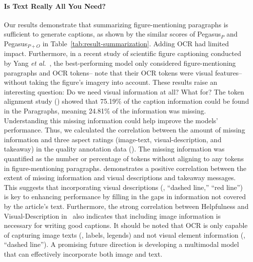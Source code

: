 \paragraph{Is Text Really All You Need?}
Our results demonstrate that summarizing figure-mentioning paragraphs is sufficient to generate captions, as shown by the similar scores of Pegasus$_{P}$ and Pegasus$_{P+O}$ in Table~\ref{tab:result-summarization}.
Adding OCR had limited impact.
Furthermore,
in a recent study of scientific figure captioning conducted by Yang {\em et al.}~\cite{scicap-plus}, the best-performing model only considered figure-mentioning paragraphs and OCR tokens-- note that their OCR tokens were visual features-- without taking the figure's imagery into account. 
These results raise an interesting question: 
Do we need visual information at all? What for?
The token alignment study () showed that 75.19\% of the caption information could be found in the Paragraphs, meaning 24.81\% of the information was missing.
Understanding this missing information could help improve the models' performance.
Thus, we calculated the correlation between the amount of missing information and three aspect ratings (image-text, visual-description, and takeaway) in the quality annotation data ().
The missing information was quantified as the number or percentage of tokens without aligning to any tokens in figure-mentioning paragraphs.
 demonstrates a positive correlation between the extent of missing information and visual descriptions and takeaway messages.
This suggests that incorporating visual descriptions (\eg, ``dashed line,'' ``red line'') is key to enhancing performance by filling in the gaps in information not covered by the article's text.
Furthermore, the strong correlation between Helpfulness and Visual-Description in~ also indicates that including image information is necessary for writing good captions.
It should be noted that OCR is only capable of capturing image texts (\eg, labels, legends) and not visual element information (\eg, ``dashed line'').
A promising future direction is developing a multimodal model that can effectively incorporate both image and text.


